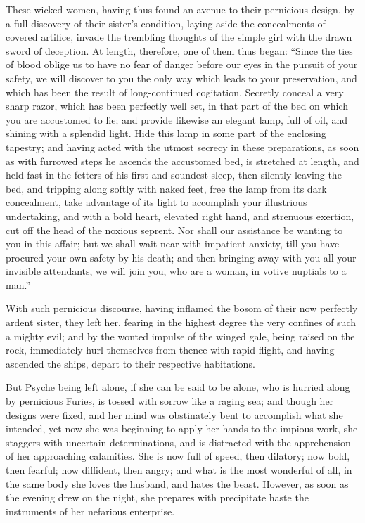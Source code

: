 \documentclass[12pt]{article}
\begin{document}
These wicked women, having thus found an avenue to their pernicious design, by
a full discovery of their sister's condition, laying aside the concealments of
covered artifice, invade the trembling thoughts of the simple girl with the
drawn sword of deception. At length, therefore, one of them thus began: ``Since
the ties of blood oblige us to have no fear of danger before our eyes in the
pursuit of your safety, we will discover to you the only way which leads to
your preservation, and which has been the result of long-continued cogitation.
Secretly conceal a very sharp razor, which has been perfectly well set, in that
part of the bed on which you are accustomed to lie; and provide likewise an
elegant lamp, full of oil, and shining with a splendid light. Hide this lamp in
some part of the enclosing tapestry; and having acted with the utmost secrecy
in these preparations, as soon as with furrowed steps he ascends the accustomed
bed, is stretched at length, and held fast in the fetters of his first and
soundest sleep, then silently leaving the bed, and tripping along softly with
naked feet, free the lamp from its dark concealment, take advantage of its
light to accomplish your illustrious undertaking, and with a bold heart,
elevated right hand, and strenuous exertion, cut off the head of the noxious
seprent. Nor shall our assistance be wanting to you in this affair; but we
shall wait near with impatient anxiety, till you have procured your own safety
by his death; and then bringing away with you all your invisible attendants, we
will join you, who are a woman, in votive nuptials to a man.''

With such pernicious discourse, having inflamed the bosom of their now
perfectly ardent sister, they left her, fearing in the highest degree the very
confines of such a mighty evil; and by the wonted impulse of the winged gale,
being raised on the rock, immediately hurl themselves from thence with rapid
flight, and having ascended the ships, depart to their respective habitations.

But Psyche being left alone, if she can be said to be alone, who is hurried
along by pernicious Furies, is tossed with sorrow like a raging sea; and though
her designs were fixed, and her mind was obstinately bent to accomplish what
she intended, yet now she was beginning to apply her hands to the impious work,
she staggers with uncertain determinations, and is distracted with the
apprehension of her approaching calamities. She is now full of speed, then
dilatory; now bold, then fearful; now diffident, then angry; and what is the
most wonderful of all, in the same body she loves the husband, and hates the
beast. However, as soon as the evening drew on the night, she prepares with
precipitate haste the instruments of her nefarious enterprise.
\end{document}
